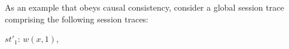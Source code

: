 \documentclass[journal,compsoc]{IEEEtran}
\begin{document}

As an example that obeys causal consistency, consider a global session trace comprising the following session traces:

$\mathit{st}'_1$: $w(x,1)$, 
\end{document}
